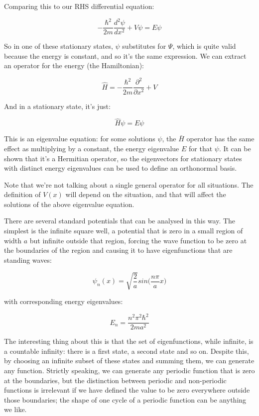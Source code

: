 Comparing this to our RHS differential equation:

$$
- \frac{\hbar^2}{2m}
\frac{d^2 \psi}{d x^2}
+ V\psi
=
E\psi
$$

So in one of these stationary states, $\psi$ substitutes for $\Psi$, which is quite valid because the energy is constant, and so it's the same expression. We can extract an operator for the energy (the Hamiltonian):

$$
\hat{H} = 
- \frac{\hbar^2}{2m} \frac{\partial^2}{\partial x^2} + V
$$

And in a stationary state, it's just:

$$
\hat{H}\psi
=
E\psi
$$

This is an eigenvalue equation: for some solutions $\psi$, the $\bar{H}$ operator has the same effect as multiplying by a constant, the energy eigenvalue $E$ for that $\psi$. It can be shown that it's a Hermitian operator, so the eigenvectors for stationary states with distinct energy eigenvalues can be used to define an orthonormal basis.

Note that we're not talking about a single general operator for all situations. The definition of $V(x)$ will depend on the situation, and that will affect the solutions of the above eigenvalue equation.

There are several standard potentials that can be analysed in this way. The simplest is the infinite square well, a potential that is zero in a small region of width $a$ but infinite outside that region, forcing the wave function to be zero at the boundaries of the region and causing it to have eigenfunctions that are standing waves:

$$
\psi_n(x) =
\sqrt{\frac{2}{a}} sin \lparen \frac{n\pi}{a} x\rparen
$$

with corresponding energy eigenvalues:

$$
E_n = \frac{n^2\pi^2\hbar^2}{2ma^2}
$$

The interesting thing about this is that the set of eigenfunctions, while infinite, is a countable infinity: there is a first state, a second state and so on. Despite this, by choosing an infinite subset of these states and summing them, we can generate any function. Strictly speaking, we can generate any periodic function that is zero at the boundaries, but the distinction between periodic and non-periodic functions is irrelevant if we have defined the value to be zero everywhere outside those boundaries; the shape of one cycle of a periodic function can be anything we like.

